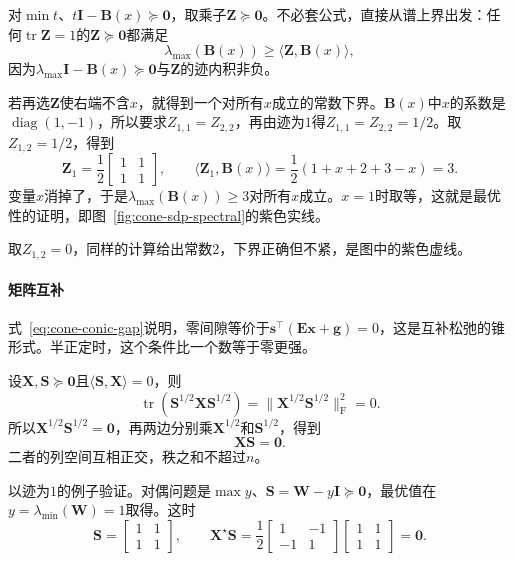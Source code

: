 \begin{example}[谱上界的对偶证书]
\label{ex:cone-spectral-dual}
对$\min t$、$t\bm{I}-\bm{B}(x)\succeq\bm{0}$，取乘子$\bm{Z}\succeq\bm{0}$。不必套公式，直接从谱上界出发：任何$\operatorname{tr}\bm{Z}=1$的$\bm{Z}\succeq\bm{0}$都满足
\[
 \lambda_{\max}(\bm{B}(x))\geq\langle\bm{Z},\bm{B}(x)\rangle,
\]
因为$\lambda_{\max}\bm{I}-\bm{B}(x)\succeq\bm{0}$与$\bm{Z}$的迹内积非负。

若再选$\bm{Z}$使右端不含$x$，就得到一个对所有$x$成立的常数下界。$\bm{B}(x)$中$x$的系数是$\operatorname{diag}(1,-1)$，所以要求$Z_{1,1}=Z_{2,2}$，再由迹为$1$得$Z_{1,1}=Z_{2,2}=1/2$。取$Z_{1,2}=1/2$，得到
\[
 \bm{Z}_1=\frac12\begin{bmatrix}1&1\\1&1\end{bmatrix},\qquad
 \langle\bm{Z}_1,\bm{B}(x)\rangle=\frac12(1+x+2+3-x)=3.
\]
变量$x$消掉了，于是$\lambda_{\max}(\bm{B}(x))\geq3$对所有$x$成立。$x=1$时取等，这就是最优性的证明，即图~\ref{fig:cone-sdp-spectral}的紫色实线。

取$Z_{1,2}=0$，同样的计算给出常数$2$，下界正确但不紧，是图中的紫色虚线。
\end{example}

\paragraph{矩阵互补}
式~\eqref{eq:cone-conic-gap}说明，零间隙等价于$\bm{s}^\top(\bm{E}\bm{x}+\bm{g})=0$，这是互补松弛的锥形式。半正定时，这个条件比一个数等于零更强。

设$\bm{X},\bm{S}\succeq\bm{0}$且$\langle\bm{S},\bm{X}\rangle=0$，则
\[
 \operatorname{tr}(\bm{S}^{1/2}\bm{X}\bm{S}^{1/2})=\lVert\bm{X}^{1/2}\bm{S}^{1/2}\rVert_{\mathrm{F}}^2=0.
\]
所以$\bm{X}^{1/2}\bm{S}^{1/2}=\bm{0}$，再两边分别乘$\bm{X}^{1/2}$和$\bm{S}^{1/2}$，得到
\begin{equation}
 \bm{X}\bm{S}=\bm{0}.
 \label{eq:cone-matrix-complementarity}
\end{equation}
二者的列空间互相正交，秩之和不超过$n$。

以迹为$1$的例子验证。对偶问题是$\max y$、$\bm{S}=\bm{W}-y\bm{I}\succeq\bm{0}$，最优值在$y=\lambda_{\min}(\bm{W})=1$取得。这时
\[
 \bm{S}=\begin{bmatrix}1&1\\1&1\end{bmatrix},\qquad
 \bm{X}^\star\bm{S}=\frac12\begin{bmatrix}1&-1\\-1&1\end{bmatrix}\begin{bmatrix}1&1\\1&1\end{bmatrix}=\bm{0}.
\]

